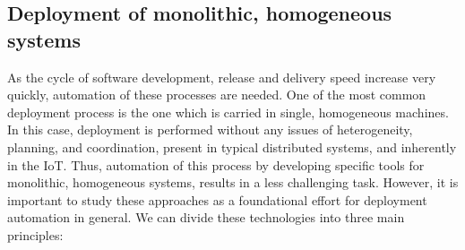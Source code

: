 \subsection{Deployment of monolithic, homogeneous systems}
\label{subsec:singleDeployment}
As the cycle of software development, release and delivery speed increase very quickly, automation of these processes are needed.
One of the most common deployment process is the one which is carried in single, homogeneous machines.
In this case, deployment is performed without any issues of heterogeneity, planning, and coordination, present in typical distributed systems, and inherently in the IoT.
Thus, automation of this process by developing specific tools for monolithic, homogeneous systems, results in a less challenging task.
However, it is important to study these approaches as a foundational effort for deployment automation in general.
We can divide these technologies into three main principles:
